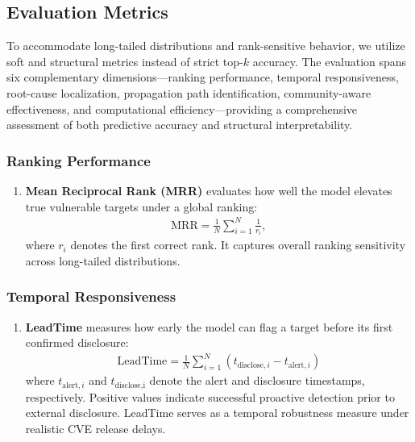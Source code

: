 \subsection{Evaluation Metrics}
To accommodate long-tailed distributions and rank-sensitive behavior, we utilize soft and structural metrics instead of strict top-$k$ accuracy. The evaluation spans six complementary dimensions—ranking performance, temporal responsiveness, root-cause localization, propagation path identification, community-aware effectiveness, and computational efficiency—providing a comprehensive assessment of both predictive accuracy and structural interpretability.

\subsubsection{Ranking Performance} 
\begin{enumerate}
    \item \textbf{Mean Reciprocal Rank (MRR)} evaluates how well the model elevates true vulnerable targets under a global ranking:
    \begin{align}
        \mathrm{MRR} = \frac{1}{N} \sum_{i=1}^{N} \frac{1}{r_i},
    \end{align}
    where $r_i$ denotes the first correct rank.
    It captures overall ranking sensitivity across long-tailed distributions. 
\end{enumerate}


\subsubsection{Temporal Responsiveness}
\begin{enumerate}
    \item \textbf{LeadTime} measures how early the model can flag a target before its first confirmed disclosure:
    \begin{align}
    \mathrm{LeadTime}=\frac{1}{N} \sum_{i=1}^{N} (t_{\text{disclose},i} - t_{\text{alert},i})
    \end{align}
    where $t_{\text{alert},i}$ and $t_{\text{disclose,i}}$ denote the alert and disclosure timestamps, respectively.  
    Positive values indicate successful proactive detection prior to external disclosure.
    LeadTime serves as a temporal robustness measure under realistic CVE release delays.
\end{enumerate}


